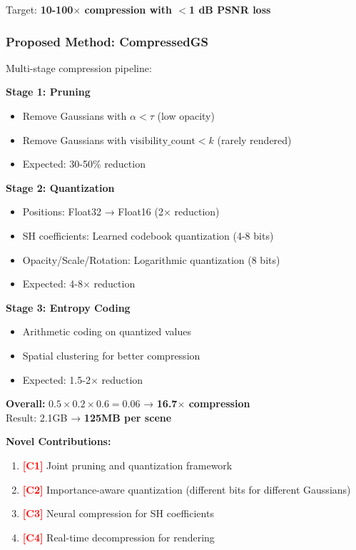 \documentclass[11pt,letterpaper]{article}
\newcommand{\method}[1]{\textbf{#1}}
\newcommand{\contribution}[1]{\textcolor{red}{\textbf{[#1]}}}
\begin{document}
Target: \textbf{10-100$\times$ compression with $<$1 dB PSNR loss}

\subsubsection{Proposed Method: \method{CompressedGS}}

Multi-stage compression pipeline:

\textbf{Stage 1: Pruning}
\begin{itemize}[leftmargin=*]
    \item Remove Gaussians with $\alpha < \tau$ (low opacity)
    \item Remove Gaussians with $\text{visibility\_count} < k$ (rarely rendered)
    \item Expected: 30-50\% reduction
\end{itemize}

\textbf{Stage 2: Quantization}
\begin{itemize}[leftmargin=*]
    \item Positions: Float32 → Float16 (2$\times$ reduction)
    \item SH coefficients: Learned codebook quantization (4-8 bits)
    \item Opacity/Scale/Rotation: Logarithmic quantization (8 bits)
    \item Expected: 4-8$\times$ reduction
\end{itemize}

\textbf{Stage 3: Entropy Coding}
\begin{itemize}[leftmargin=*]
    \item Arithmetic coding on quantized values
    \item Spatial clustering for better compression
    \item Expected: 1.5-2$\times$ reduction
\end{itemize}

\textbf{Overall: } $0.5 \times 0.2 \times 0.6 = 0.06$ → \textbf{16.7$\times$ compression} \\
Result: 2.1GB → \textbf{125MB per scene}

\textbf{Novel Contributions:}
\begin{enumerate}[leftmargin=*]
    \item \contribution{C1} Joint pruning and quantization framework
    \item \contribution{C2} Importance-aware quantization (different bits for different Gaussians)
    \item \contribution{C3} Neural compression for SH coefficients
    \item \contribution{C4} Real-time decompression for rendering
\end{enumerate}
\end{document}
